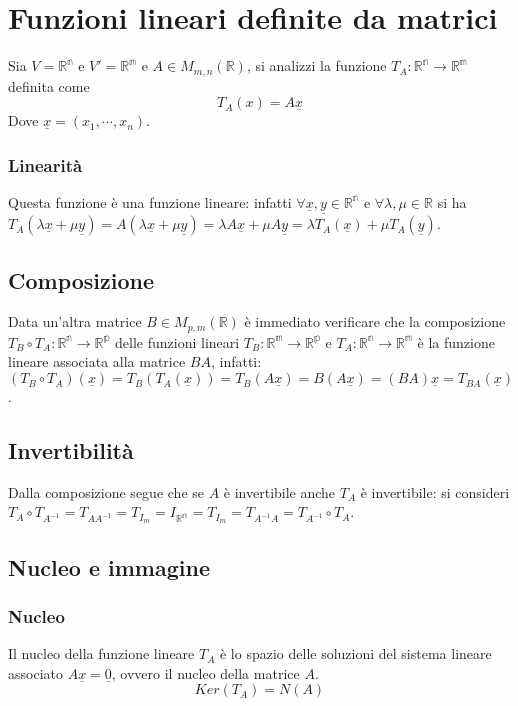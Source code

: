 \section{Funzioni lineari definite da matrici}
Sia $V=\mathbb{R^n}$ e $V'=\mathbb{R^m}$ e $A\in M_{m,n}(\mathbb{R})$, si analizzi la funzione $T_A:\mathbb{R^n}\rightarrow\mathbb{R^m}$ definita come
\begin{equation}
T_A(x)=A\underline{x}
\end{equation} 
Dove $\underline{x}=(x_1,\cdots,x_n)$. 
\subsubsection{Linearit\`a}
Questa funzione \`e una funzione lineare: infatti $\forall\underline{x},\underline{y}\in\mathbb{R^n}$ e $\forall\lambda,\mu\in\mathbb{R}$ 
si ha $T_A(\lambda\underline{x}+\mu\underline{y})=A(\lambda\underline{x}+\mu\underline{y})=\lambda A\underline{x}+\mu A\underline{y}=\lambda T_A(\underline{x})+\mu 
T_A(\underline{y})$.
\subsection{Composizione}
Data un'altra matrice $B\in M_{p,m}(\mathbb{R})$ \`e immediato verificare che la composizione $T_B\circ T_A:\mathbb{R^n}\rightarrow\mathbb{R^p}$ delle funzioni lineari $T_B:
\mathbb{R^m}\rightarrow\mathbb{R^p}$ e $T_A:\mathbb{R^n}\rightarrow\mathbb{R^m}$ \`e la funzione lineare associata alla matrice $BA$, infatti: $(T_B\circ T_A)(\underline{x})
=T_B(T_A(\underline{x}))=T_B(A\underline{x})=B(A\underline{x})=(BA)\underline{x}=T_{BA}(\underline{x})$.
\subsection{Invertibilit\`a}
Dalla composizione segue che se $A$ \`e invertibile anche $T_A$ \`e invertibile: si consideri $T_A\circ T_{A^{-1}}=T_{AA^{-1}}=T_{I_m}=I_{\mathbb{R^m}}=T_{I_m}=T_{A^{-1}A}=
T_{A^{-1}}\circ T_A$.
\subsection{Nucleo e immagine}
\subsubsection{Nucleo}
Il nucleo della funzione lineare $T_A$ \`e lo spazio delle soluzioni del sistema lineare associato $A\underline{x}=\underline{0}$, ovvero il nucleo della matrice $A$.
\begin{equation}
Ker(T_A)=N(A)
\end{equation}
